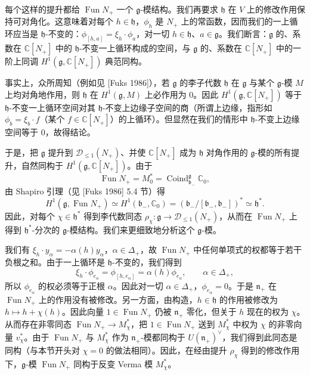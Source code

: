 每个这样的提升都给 $\operatorname{Fun}N_+$ 一个 $\mathfrak{g}$-模结构。我们再要求 $\mathfrak{h}$ 在 $V$ 上的修改作用保持可对角化。这意味着对每个 $h\in\mathfrak{h}$，$\phi_h$ 是 $N_+$ 上的常函数，因而我们的一上循环应当是 $\mathfrak{h}$-不变的：$\phi_{[h,a]}=\xi_h\cdot\phi_a$，对一切 $h\in\mathfrak{h}$、$a\in\mathfrak{g}$。我们断言：$\mathfrak{g}$ 的、系数在 $\mathbb{C}[N_+]$ 中的 $\mathfrak{h}$-不变一上循环构成的空间，与 $\mathfrak{g}$ 的、系数在 $\mathbb{C}[N_+]$ 中的一阶上同调 $H^1(\mathfrak{g},\mathbb{C}[N_+])$ 典范同构。


事实上，众所周知（例如见 [Fuks 1986]），若 $\mathfrak{g}$ 的李子代数 $\mathfrak{h}$ 在 $\mathfrak{g}$ 与某个 $\mathfrak{g}$-模 $M$ 上均对角地作用，则 $\mathfrak{h}$ 在 $H^1(\mathfrak{g},M)$ 上必作用为 $0$。因此 $H^1(\mathfrak{g},\mathbb{C}[N_+])$ 等于 $\mathfrak{h}$-不变一上循环空间对其 $\mathfrak{h}$-不变上边缘子空间的商（所谓上边缘，指形如 $\phi_b=\xi_b\cdot f$（某个 $f\in\mathbb{C}[N_+]$）的上循环）。但显然在我们的情形中 $\mathfrak{h}$-不变上边缘空间等于 $0$，故得结论。

于是，把 $\mathfrak{g}$ 提升到 $\mathcal{D}_{\le1}(N_+)$、并使 $\mathbb{C}[N_+]$ 成为 $\mathfrak{h}$ 对角作用的 $\mathfrak{g}$-模的所有提升，自然同构于 $H^1(\mathfrak{g},\mathbb{C}[N_+])$。由于
\[
    \operatorname{Fun}N_+=M_0^*=\operatorname{Coind}^{\mathfrak{g}}_{\mathfrak{b}_-}\mathbb{C}_0,
\]
由 Shapiro 引理（见 [Fuks 1986] 5.4 节）得
\[
    H^1(\mathfrak{g},\operatorname{Fun}N_+)\simeq H^1(\mathfrak{b}_-,\mathbb{C}_0)
    =(\mathfrak{b}_-/{[\mathfrak{b}_-,\mathfrak{b}_-]})^*\simeq\mathfrak{h}^*.
\]
因此，对每个 $\chi\in\mathfrak{h}^*$ 得到李代数同态 $\rho_\chi:\mathfrak{g}\to\mathcal{D}_{\le1}(N_+)$，从而在 $\operatorname{Fun}N_+$ 上得到 $\mathfrak{h}^*$-分次的 $\mathfrak{g}$-模结构。我们来更细致地分析这个 $\mathfrak{g}$-模。

我们有 $\xi_h\cdot y_\alpha=-\alpha(h)y_\alpha$，$\alpha\in\Delta_+$，故 $\operatorname{Fun}N_+$ 中任何单项式的权都等于若干负根之和。由于一上循环是 $\mathfrak{h}$-不变的，我们得到
\[
    \xi_h\cdot\phi_{e_\alpha}=\phi_{[h,e_\alpha]}=\alpha(h)\phi_{e_\alpha},
    \qquad\alpha\in\Delta_+,
\]
所以 $\phi_{e_\alpha}$ 的权必须等于正根 $\alpha$。因此对一切 $\alpha\in\Delta_+$，$\phi_{e_\alpha}=0$。于是 $\mathfrak{n}_+$ 在 $\operatorname{Fun}N_+$ 上的作用没有被修改。另一方面，由构造，$h\in\mathfrak{h}$ 的作用被修改为 $h\mapsto h+\chi(h)$。因此向量 $1\in\operatorname{Fun}N_+$ 仍被 $\mathfrak{n}_+$ 零化，但关于 $h$ 现在的权为 $\chi$。从而存在非零同态 $\operatorname{Fun}N_+\to M_\chi^*$，把 $1\in\operatorname{Fun}N_+$ 送到 $M_\chi^*$ 中权为 $\chi$ 的非零向量 $v_\chi^*$。由于 $\operatorname{Fun}N_+$ 与 $M_\chi^*$ 作为 $\mathfrak{n}_+$-模都同构于 $U(\mathfrak{n}_+)^\vee$，我们得到此同态是同构（与本节开头对 $\chi=0$ 的做法相同）。因此，在经由提升 $\rho_\chi$ 得到的修改作用下，$\mathfrak{g}$-模 $\operatorname{Fun}N_+$ 同构于反变 Verma 模 $M_\chi^*$。

